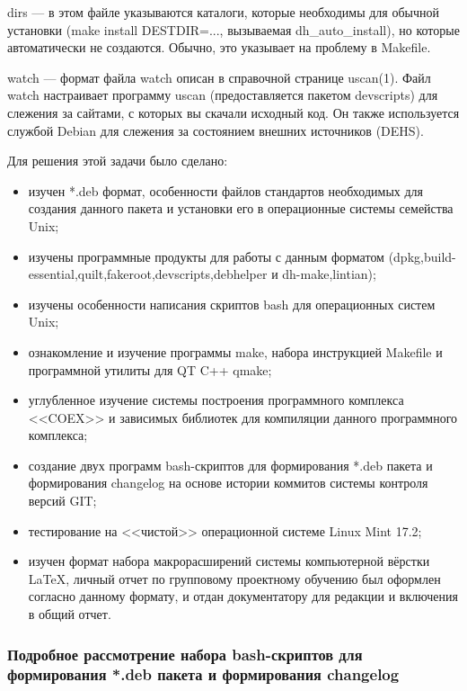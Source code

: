 dirs --- в этом файле указываются каталоги, которые необходимы для обычной установки (make install DESTDIR=..., вызываемая dh\_auto\_install), но которые автоматически не создаются. Обычно, это указывает на проблему в Makefile.~\cite{deb_package_howto}

watch --- формат файла watch описан в справочной странице uscan(1). Файл watch настраивает программу uscan (предоставляется пакетом devscripts) для слежения за сайтами, с которых вы скачали исходный код. Он также используется службой Debian для слежения за состоянием внешних источников (DEHS).~\cite{deb_package_howto}

Для решения этой задачи было сделано:

\begin{itemize}
\item изучен *.deb формат, особенности файлов стандартов необходимых для создания данного пакета и установки его в операционные системы семейства Unix; 
\item изучены программные продукты для работы с данным форматом (dpkg,build-essential,quilt,fakeroot,devscripts,debhelper и dh-make,lintian);
\item изучены особенности написания скриптов bash для операционных систем Unix;
\item ознакомление и изучение программы make, набора инструкцией Makefile и программной утилиты для QT C++ qmake;
\item углубленное изучение системы построения программного комплекса <<COEX>> и зависимых библиотек для компиляции данного программного комплекса;
\item создание двух программ bash-скриптов для формирования *.deb пакета и формирования changelog на основе истории коммитов системы контроля версий GIT;
\item тестирование на <<чистой>> операционной системе Linux Mint 17.2;
\item изучен формат набора макрорасширений системы компьютерной вёрстки LaTeX, личный отчет по групповому проектному обучению был оформлен согласно данному формату, и отдан документатору для редакции и включения в общий отчет.
\end{itemize}

\subsubsection{ Подробное рассмотрение набора bash-скриптов для формирования *.deb пакета и формирования changelog}

